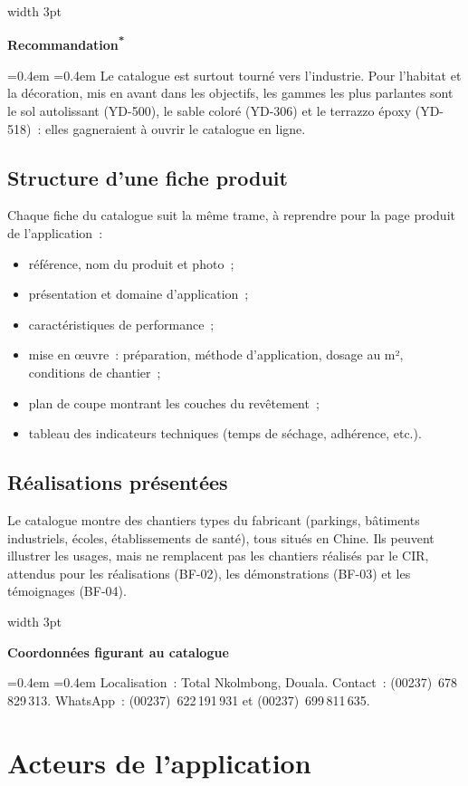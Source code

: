 \documentclass[11pt,a4paper]{article}
\newcommand{\prop}{\textsuperscript{\color{circoral}\textbf{*}}}
\newcommand{\encadre}[2]{%
  \par\smallskip\noindent
  {\color{circoral}\vrule width 3pt}%
  \colorbox{cirtint}{\parbox{\dimexpr\linewidth-3pt-2\fboxsep\relax}{%
    \vspace{0.3em}\hspace{0.4em}\textbf{\color{cirblue}#1}\par\vspace{0.15em}
    \leftskip=0.4em \rightskip=0.4em #2\par\vspace{0.3em}}}%
  \par\smallskip}
\begin{document}
\encadre{Recommandation\prop}{Le catalogue est surtout tourné vers
l'industrie. Pour l'habitat et la décoration, mis en avant dans les objectifs,
les gammes les plus parlantes sont le sol autolissant (YD-500), le sable coloré
(YD-306) et le terrazzo époxy (YD-518)~: elles gagneraient à ouvrir le
catalogue en ligne.}

\subsection{Structure d'une fiche produit}
\label{sec:fiche}

Chaque fiche du catalogue suit la même trame, à reprendre pour la page produit
de l'application~:

\begin{itemize}
  \item référence, nom du produit et photo~;
  \item présentation et domaine d'application~;
  \item caractéristiques de performance~;
  \item mise en œuvre~: préparation, méthode d'application, dosage au m²,
        conditions de chantier~;
  \item plan de coupe montrant les couches du revêtement~;
  \item tableau des indicateurs techniques (temps de séchage, adhérence,
        etc.).
\end{itemize}

\subsection{Réalisations présentées}

Le catalogue montre des chantiers types du fabricant (parkings, bâtiments
industriels, écoles, établissements de santé), tous situés en Chine. Ils
peuvent illustrer les usages, mais ne remplacent pas les chantiers réalisés
par le CIR, attendus pour les réalisations (BF-02), les démonstrations (BF-03)
et les témoignages (BF-04).

\encadre{Coordonnées figurant au catalogue}{Localisation~: Total Nkolmbong,
Douala. Contact~: (00237)~678\,829\,313. WhatsApp~: (00237)~622\,191\,931 et
(00237)~699\,811\,635.}

\section{Acteurs de l'application}
\end{document}
